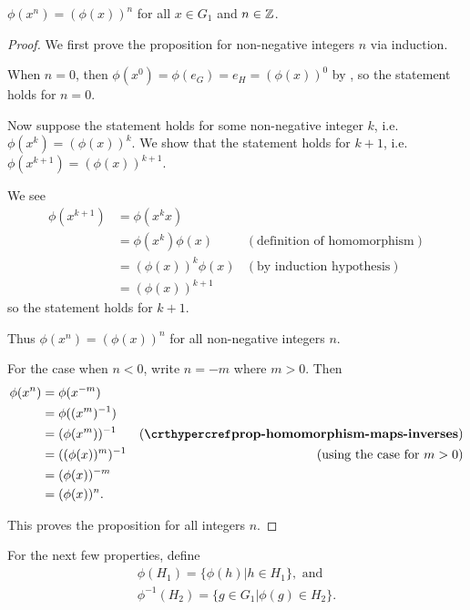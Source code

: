 \begin{proposition}
    $\phi(x^n) = (\phi(x))^n$ for all $x \in G_1$ and $n \in \mathbb{Z}$.
\end{proposition}
\begin{proof}
    We first prove the proposition for non-negative integers $n$ via induction.

    When $n = 0$, then $\phi(x^0) = \phi(e_G) = e_H = (\phi(x))^0$ by , so the statement holds for $n = 0$.

    Now suppose the statement holds for some non-negative integer $k$, i.e. $\phi(x^k) = (\phi(x))^k$. We show that the statement holds for $k + 1$, i.e. $\phi(x^{k+1}) = (\phi(x))^{k+1}$.

    We see
    \begin{align*}
        \phi(x^{k+1}) &= \phi(x^kx) \\
        &= \phi(x^k)\phi(x) & (\text{definition of homomorphism})\\
        &= (\phi(x))^k\phi(x) & (\text{by induction hypothesis})\\
        &= (\phi(x))^{k+1}
    \end{align*}
    so the statement holds for $k+1$.

    Thus $\phi(x^n) = (\phi(x))^n$ for all non-negative integers $n$.

    For the case when $n < 0$, write $n = -m$ where $m > 0$. Then
    \begin{align*}
        \phi(x^n) &= \phi(x^{-m})\\
        &= \phi((x^m)^{-1})\\
        &= (\phi(x^m))^{-1} & (\myref{prop-homomorphism-maps-inverses})\\
        &= ((\phi(x))^m)^{-1} & (\text{using the case for } m>0)\\
        &= (\phi(x))^{-m}\\
        &= (\phi(x))^n.
    \end{align*}

    This proves the proposition for all integers $n$.
\end{proof}

For the next few properties, define
\begin{gather*}
    \phi(H_1) = \{\phi(h) \vert h \in H_1\}, \text{ and}\\
    \phi^{-1}(H_2) = \{g \in G_1 \vert \phi(g) \in H_2\}.
\end{gather*}

